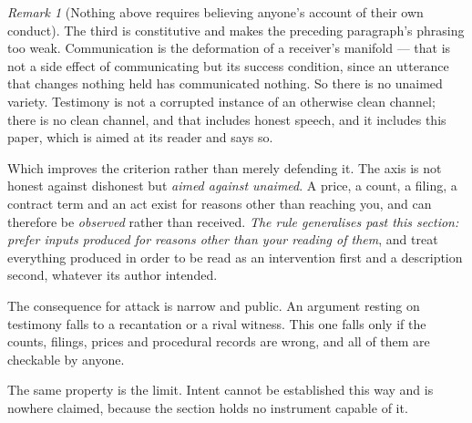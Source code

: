 \documentclass[11pt,a4paper]{article}
\theoremstyle{remark}
\newtheorem{remark}[definition]{Remark}
\begin{document}
\begin{remark}[Nothing above requires believing anyone's account of their own conduct]
The third is constitutive and makes the preceding paragraph's phrasing too weak.
Communication is the deformation of a receiver's manifold --- that is not a side effect of
communicating but its success condition, since an utterance that changes nothing held has communicated
nothing. So there is no unaimed variety. Testimony is not a corrupted instance of an otherwise
clean channel; there is no clean channel, and that includes honest speech, and it includes this
paper, which is aimed at its reader and says so.

Which improves the criterion rather than merely defending it. The axis is not honest against
dishonest but \emph{aimed against unaimed}. A price, a count, a filing, a contract term and an act exist
for reasons other than reaching you, and can therefore be \emph{observed} rather than received.
\emph{The rule generalises past this section: prefer inputs produced for reasons other than your reading
of them}, and treat everything produced in order to be read as an intervention first and a description
second, whatever its author intended.

The consequence for attack is narrow and public. An argument resting on testimony falls to a
recantation or a rival witness. This one falls only if the counts, filings, prices and procedural
records are wrong, and all of them are checkable by anyone.

The same property is the limit. Intent cannot be established this way and is nowhere
claimed, because the section holds no instrument capable of it.
\end{remark}
\end{document}
